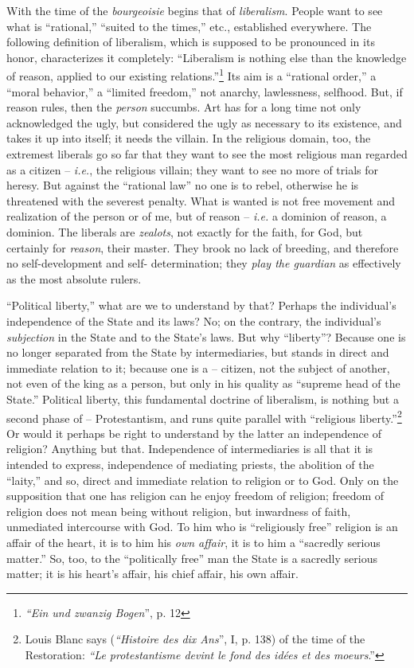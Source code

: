 \documentclass[12pt,a4paper]{book}
\begin{document}
With the time of the \textit{bourgeoisie} begins that of \textit{liberalism}. 
People want to see what is ``rational,'' ``suited to the times,'' etc., 
established everywhere. The following definition of liberalism, which is 
supposed to be pronounced in its honor, characterizes it completely: 
``Liberalism is nothing else than the knowledge of reason, applied to our 
existing relations.''\footnote{\textit{``Ein und zwanzig Bogen}'', p. 12} 
Its aim is a ``rational order,'' a ``moral behavior,'' a ``limited 
freedom,'' not anarchy, lawlessness, selfhood. But, if reason rules, then the 
\textit{person} succumbs. Art has for a long time not only acknowledged the 
ugly, but considered the ugly as necessary to its existence, and takes it up 
into itself; it needs the villain. In the religious domain, too, the extremest 
liberals go so far that they want to see the most religious man regarded as a 
citizen -- \textit{i.e.}, the religious villain; they want to see no more of 
trials for heresy. But against the ``rational law'' no one is to rebel, 
otherwise he is threatened with the severest penalty. What is wanted is not 
free movement and realization of the person or of me, but of reason -- 
\textit{i.e.} a dominion of reason, a dominion. The liberals are 
\textit{zealots}, not exactly for the faith, for God, but certainly for 
\textit{reason}, their master. They brook no lack of breeding, and therefore 
no self-development and self- determination; they \textit{play the guardian} 
as effectively as the most absolute rulers.

``Political liberty,'' what are we to understand by that? Perhaps the 
individual's independence of the State and its laws? No; on the contrary, the 
individual's \textit{subjection} in the State and to the State's laws. But why 
``liberty''? Because one is no longer separated from the State by 
intermediaries, but stands in direct and immediate relation to it; because one 
is a -- citizen, not the subject of another, not even of the king as a person, 
but only in his quality as ``supreme head of the State.'' Political liberty, 
this fundamental doctrine of liberalism, is nothing but a second phase of -- 
Protestantism, and runs quite parallel with ``religious 
liberty.''\footnote{Louis Blanc says (\textit{``Histoire des dix Ans}'', I, 
p. 138) of the time of the Restoration: \textit{``Le protestantisme devint le 
fond des id\'ees et des moeurs}.''} Or would it perhaps be right to 
understand by the latter an independence of religion? Anything but that. 
Independence of intermediaries is all that it is intended to express, 
independence of mediating priests, the abolition of the ``laity,'' and so, 
direct and immediate relation to religion or to God. Only on the supposition 
that one has religion can he enjoy freedom of religion; freedom of religion 
does not mean being without religion, but inwardness of faith, unmediated 
intercourse with God. To him who is ``religiously free'' religion is an 
affair of the heart, it is to him his \textit{own affair}, it is to him a 
``sacredly serious matter.'' So, too, to the ``politically free'' man the 
State is a sacredly serious matter; it is his heart's affair, his chief 
affair, his own affair.
\end{document}
